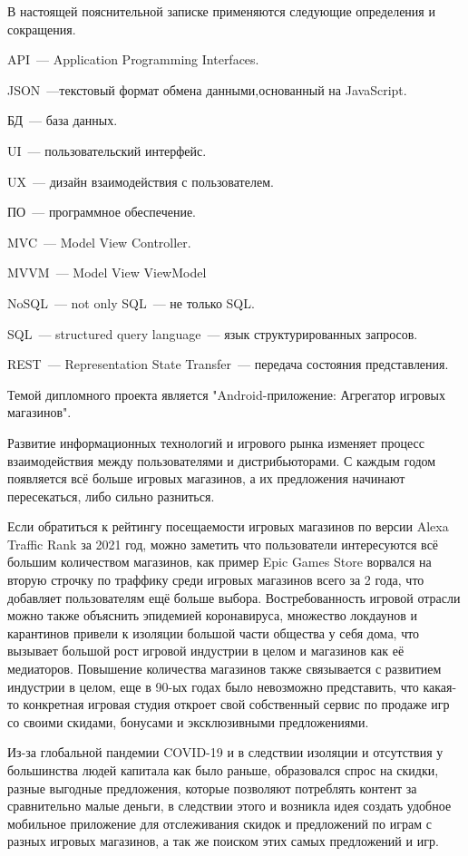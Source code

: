 \setcounter{page}{6}
В настоящей пояснительной записке применяются следующие определения и сокращения.

API~--- Application Programming Interfaces.

JSON~---текстовый формат обмена данными,основанный на JavaScript.

БД~--- база данных.

UI~--- пользовательский интерфейс.

UX~--- дизайн взаимодействия с пользователем.

ПО~--- программное обеспечение.

MVC~--- Model View Controller.

MVVM~--- Model View ViewModel

NoSQL~--- not only SQL~--- не только SQL.

SQL~--- structured query language~--- язык структурированных запросов.

REST~--- Representation State Transfer~--- передача состояния представления.
\newpage


\label{sec:intro}

Темой дипломного проекта является "Android-приложение: Агрегатор игровых магазинов".

Развитие информационных технологий и игрового рынка изменяет процесс взаимодействия между пользователями и дистрибьюторами. С каждым годом появляется всё больше игровых магазинов, а их предложения начинают пересекаться, либо сильно разниться. 

Если обратиться к рейтингу посещаемости игровых магазинов по версии Alexa Traffic Rank\cite{web0} за 2021 год, можно заметить что пользователи интересуются всё большим количеством магазинов, как пример Epic Games Store ворвался на вторую строчку по траффику среди игровых магазинов всего за 2 года, что добавляет пользователям ещё больше выбора.
Востребованность игровой отрасли можно также объяснить эпидемией коронавируса, множество локдаунов и карантинов привели к изоляции большой части общества у себя дома, что вызывает большой рост игровой индустрии в целом и магазинов как её медиаторов.
Повышение количества магазинов также связывается с развитием индустрии в целом, еще в 90-ых годах было невозможно представить, что какая-то конкретная игровая студия откроет свой собственный сервис по продаже игр со своими скидами, бонусами и эксклюзивными предложениями.

Из-за глобальной пандемии COVID-19 и в следствии изоляции и отсутствия у большинства людей капитала как было раньше, образовался спрос на скидки, разные выгодные предложения, которые позволяют потреблять контент за сравнительно малые деньги, в следствии этого и возникла идея создать удобное мобильное приложение для отслеживания скидок и предложений по играм с разных игровых магазинов, а так же поиском этих самых предложений и игр.